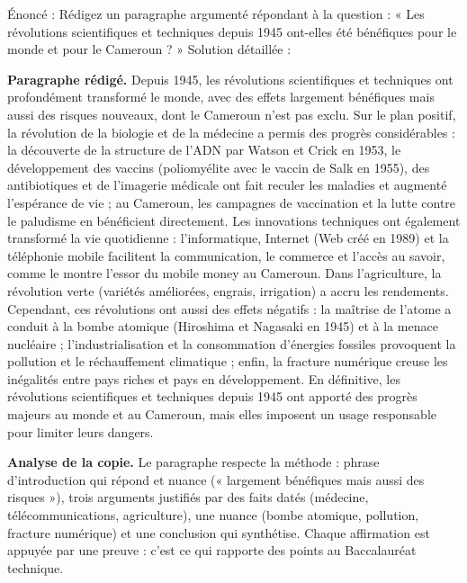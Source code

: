 \documentclass[11pt]{article}
\begin{document}
\begin{exoresolu}
Énoncé : Rédigez un paragraphe argumenté répondant à la question : « Les révolutions scientifiques et techniques depuis 1945 ont-elles été bénéfiques pour le monde et pour le Cameroun ? »
\tcblower
Solution détaillée :

\textbf{Paragraphe rédigé.} Depuis 1945, les révolutions scientifiques et techniques ont profondément transformé le monde, avec des effets largement bénéfiques mais aussi des risques nouveaux, dont le Cameroun n'est pas exclu. Sur le plan positif, la révolution de la biologie et de la médecine a permis des progrès considérables : la découverte de la structure de l'ADN par Watson et Crick en 1953, le développement des vaccins (poliomyélite avec le vaccin de Salk en 1955), des antibiotiques et de l'imagerie médicale ont fait reculer les maladies et augmenté l'espérance de vie ; au Cameroun, les campagnes de vaccination et la lutte contre le paludisme en bénéficient directement. Les innovations techniques ont également transformé la vie quotidienne : l'informatique, Internet (Web créé en 1989) et la téléphonie mobile facilitent la communication, le commerce et l'accès au savoir, comme le montre l'essor du mobile money au Cameroun. Dans l'agriculture, la révolution verte (variétés améliorées, engrais, irrigation) a accru les rendements. Cependant, ces révolutions ont aussi des effets négatifs : la maîtrise de l'atome a conduit à la bombe atomique (Hiroshima et Nagasaki en 1945) et à la menace nucléaire ; l'industrialisation et la consommation d'énergies fossiles provoquent la pollution et le réchauffement climatique ; enfin, la fracture numérique creuse les inégalités entre pays riches et pays en développement. En définitive, les révolutions scientifiques et techniques depuis 1945 ont apporté des progrès majeurs au monde et au Cameroun, mais elles imposent un usage responsable pour limiter leurs dangers.

\textbf{Analyse de la copie.} Le paragraphe respecte la méthode : phrase d'introduction qui répond et nuance (« largement bénéfiques mais aussi des risques »), trois arguments justifiés par des faits datés (médecine, télécommunications, agriculture), une nuance (bombe atomique, pollution, fracture numérique) et une conclusion qui synthétise. Chaque affirmation est appuyée par une preuve : c'est ce qui rapporte des points au Baccalauréat technique.
\end{exoresolu}
\end{document}
